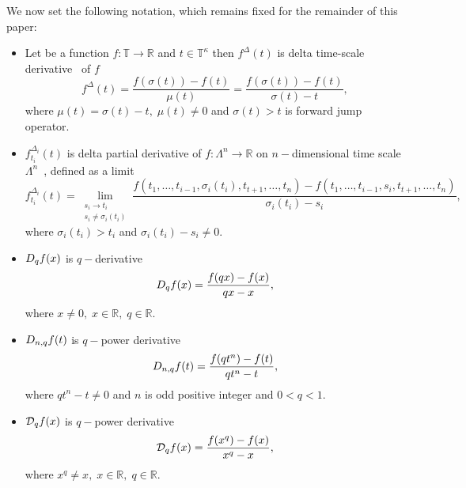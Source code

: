 We now set the following notation, which remains fixed for the remainder of this paper:
\begin{itemize}
    \setlength\itemsep{1em}
    \item Let be a function $f\colon \mathbb{T} \to \mathbb{R}$ and $t\in\mathbb{T}^{\kappa}$ then $f^{\Delta}(t)$
    is delta time-scale derivative~\cite{Bohner2001DynamicEO} of $f$
    \[
        f^{\Delta} (t) = \frac{f(\sigma(t)) - f(t)}{\mu(t)} = \frac{f(\sigma(t)) - f(t)}{\sigma(t) - t},
    \]
    where $\mu(t) = \sigma(t) - t, \; \mu(t) \neq 0$ and $\sigma(t) > t$ is forward jump operator.

    \item $f^{\Delta_i}_{t_i}(t)$ is delta partial derivative
    of $f\colon \Lambda^n \to \mathbb{R}$ on $n-$dimensional time scale
    $\Lambda^n$~\cite{bohner2004partial, ahlbrandt2002partial,JACKSON2006391},
    defined as a limit
    \[
        f^{\Delta_i}_{t_i}(t) = \lim \limits_{\substack{s_i \to t_i \\ s_i \neq \sigma_i(t_i)}}
        \frac{
            f(t_1, \ldots, t_{i-1}, \sigma_i(t_i), t_{t+1}, \ldots, t_n)
            - f(t_1, \ldots, t_{i-1}, s_i, t_{t+1}, \ldots, t_n)
        }{\sigma_i(t_i) - s_i},
    \]
    where $\sigma_i(t_i) > t_i$ and $\sigma_i(t_i) - s_i \neq 0$.

    \item $D_{q} f(x)$ is $q-$derivative~\cite{jackson_1909,ernst2000history,ernst2008different,kac2001quantum}
    \[
        D_{q} f(x) = \frac{f(qx)-f(x)}{qx-x},
    \]
    where $x\neq 0, \; x\in\mathbb{R}, \; q\in\mathbb{R}$.

    \item $D_{n,q} f(t)$ is $q-$power derivative~\cite{aldwoah2011power}
    \[
        D_{n,q} f(t) = \frac{f(qt^n) - f(t)}{qt^n - t},
    \]
    where $qt^n - t \neq 0$ and $n$ is odd positive integer and $0 < q < 1$.

    \item $\mathcal{D}_q f(x)$ is $q-$power derivative
    \[
        \mathcal{D}_q f(x) = \frac{f(x^q)-f(x)}{x^q-x},
    \]
    where $x^q \neq x, \; x\in\mathbb{R}, \; q\in\mathbb{R}$.


\end{itemize}
